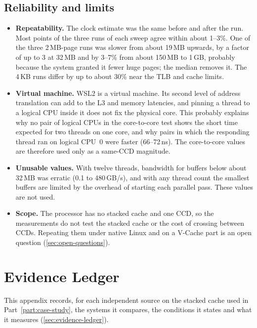 \subsection*{Reliability and limits}
\begin{itemize}
  \item \textbf{Repeatability.} The clock estimate was the same before and after the run. Most points of the three runs of each sweep agree within about 1--3\%. One of the three 2\,MB-page runs was slower from about 19\,MB upwards, by a factor of up to 3 at 32\,MB and by 3--7\% from about 150\,MB to 1\,GB, probably because the system granted it fewer huge pages; the median removes it. The 4\,KB runs differ by up to about 30\% near the TLB and cache limits.
  \item \textbf{Virtual machine.} WSL2 is a virtual machine. Its second level of address translation can add to the L3 and memory latencies, and pinning a thread to a logical CPU inside it does not fix the physical core. This probably explains why no pair of logical CPUs in the core-to-core test shows the short time expected for two threads on one core, and why pairs in which the responding thread ran on logical CPU~0 were faster (66--72\,ns). The core-to-core values are therefore used only as a same-CCD magnitude.
  \item \textbf{Unusable values.} With twelve threads, bandwidth for buffers below about 32\,MB was erratic (0.1 to 480\,GB/s), and with any thread count the smallest buffers are limited by the overhead of starting each parallel pass. These values are not used.
  \item \textbf{Scope.} The processor has no stacked cache and one CCD, so the measurements do not test the stacked cache or the cost of crossing between CCDs. Repeating them under native Linux and on a V-Cache part is an open question (\cref{sec:open-questions}).
\end{itemize}
\clearpage
\section{Evidence Ledger}
\label{app:evidence-ledger}
This appendix records, for each independent source on the stacked cache used in Part~\ref{part:case-study}, the systems it compares, the conditions it states and what it measures (\cref{sec:evidence-ledger}).

